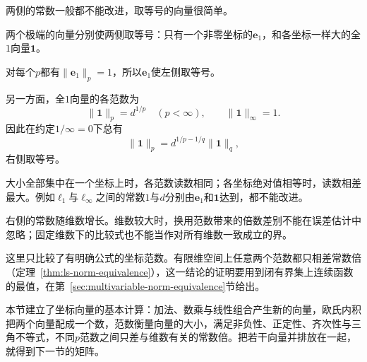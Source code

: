 两侧的常数一般都不能改进，取等号的向量很简单。
\begin{example}[比较常数的取等]
\label{ex:ls-l1-linf-constants}
两个极端的向量分别使两侧取等号：只有一个非零坐标的$\bm e_1$，和各坐标一样大的全$1$向量$\bm 1$。

对每个$p$都有$\lVert\bm e_1\rVert_p=1$，所以$\bm e_1$使左侧取等号。

另一方面，全$1$向量的各范数为
\[
 \lVert\bm 1\rVert_p=d^{1/p}\quad(p<\infty),\qquad
 \lVert\bm 1\rVert_\infty=1.
\]
因此在约定$1/\infty=0$下总有
\[
 \lVert\bm 1\rVert_p=d^{1/p-1/q}\lVert\bm 1\rVert_q,
\]
右侧取等号。

大小全部集中在一个坐标上时，各范数读数相同；各坐标绝对值相等时，读数相差最大。例如$\ell_1$与$\ell_\infty$之间的常数$1$与$d$分别由$\bm e_1$和$\bm 1$达到，都不能改进。
\end{example}
右侧的常数随维数增长。维数较大时，换用范数带来的倍数差别不能在误差估计中忽略；固定维数下的比较式也不能当作对所有维数一致成立的界。

这里只比较了有明确公式的坐标范数。有限维空间上任意两个范数都只相差常数倍（定理~\ref{thm:ls-norm-equivalence}），这一结论的证明要用到闭有界集上连续函数的最值，在第~\ref{sec:multivariable-norm-equivalence}节给出。

本节建立了坐标向量的基本计算：加法、数乘与线性组合产生新的向量，欧氏内积把两个向量配成一个数，范数衡量向量的大小，满足非负性、正定性、齐次性与三角不等式，不同$p$范数之间只差与维数有关的常数倍。把若干向量并排放在一起，就得到下一节的矩阵。
